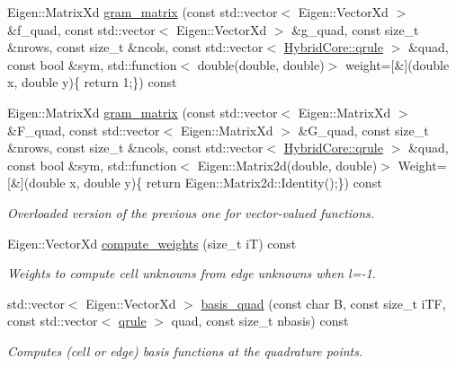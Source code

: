 \begin{DoxyCompactItemize}
Eigen\+::\+Matrix\+Xd \hyperlink{classHArDCore2D_1_1HybridCore_a0f34d7feff2d992c1004d1c67a660320}{gram\+\_\+matrix} (const std\+::vector$<$ Eigen\+::\+Vector\+Xd $>$ \&f\+\_\+quad, const std\+::vector$<$ Eigen\+::\+Vector\+Xd $>$ \&g\+\_\+quad, const size\+\_\+t \&nrows, const size\+\_\+t \&ncols, const std\+::vector$<$ \hyperlink{structHArDCore2D_1_1HybridCore_1_1qrule}{Hybrid\+Core\+::qrule} $>$ \&quad, const bool \&sym, std\+::function$<$ double(double, double)$>$ weight=\mbox{[}\&\mbox{]}(double x, double y)\{ return 1;\}) const
\item 
Eigen\+::\+Matrix\+Xd \hyperlink{classHArDCore2D_1_1HybridCore_a633814c5b4f35034d04b74f09802303d}{gram\+\_\+matrix} (const std\+::vector$<$ Eigen\+::\+Matrix\+Xd $>$ \&F\+\_\+quad, const std\+::vector$<$ Eigen\+::\+Matrix\+Xd $>$ \&G\+\_\+quad, const size\+\_\+t \&nrows, const size\+\_\+t \&ncols, const std\+::vector$<$ \hyperlink{structHArDCore2D_1_1HybridCore_1_1qrule}{Hybrid\+Core\+::qrule} $>$ \&quad, const bool \&sym, std\+::function$<$ Eigen\+::\+Matrix2d(double, double)$>$ Weight=\mbox{[}\&\mbox{]}(double x, double y)\{ return Eigen\+::\+Matrix2d\+::\+Identity();\}) const
\begin{DoxyCompactList}\small\item\em Overloaded version of the previous one for vector-\/valued functions. \end{DoxyCompactList}\item 
\mbox{\label{classHArDCore2D_1_1HybridCore_a06825c5d156026d465a2798389aa952b}} 
Eigen\+::\+Vector\+Xd \hyperlink{classHArDCore2D_1_1HybridCore_a06825c5d156026d465a2798389aa952b}{compute\+\_\+weights} (size\+\_\+t iT) const
\begin{DoxyCompactList}\small\item\em Weights to compute cell unknowns from edge unknowns when l=-\/1. \end{DoxyCompactList}\item 
std\+::vector$<$ Eigen\+::\+Vector\+Xd $>$ \hyperlink{classHArDCore2D_1_1HybridCore_adc7afe2ff1f5a56ebe48b407bdf08d6e}{basis\+\_\+quad} (const char B, const size\+\_\+t i\+TF, const std\+::vector$<$ \hyperlink{structHArDCore2D_1_1HybridCore_1_1qrule}{qrule} $>$ quad, const size\+\_\+t nbasis) const
\begin{DoxyCompactList}\small\item\em Computes (cell or edge) basis functions at the quadrature points. \end{DoxyCompactList}\item 

\end{DoxyCompactItemize}
